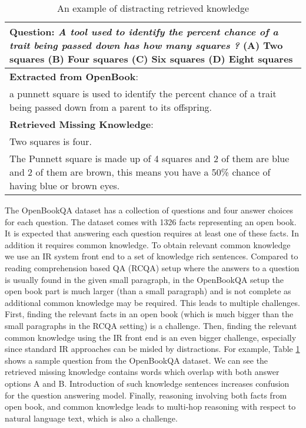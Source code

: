 \documentclass[11pt,a4paper]{article}
\begin{document}
\begin{table}[H]
\begin{center}
\begin{tabular}{|p{7cm}|}
\hline \textbf{Question:} \textit{A tool used to identify the percent chance of a trait being passed down has how many squares ? } (A) Two squares (B) \textbf{Four squares} (C) Six squares (D) Eight squares \\  
\hline
\textbf{Extracted from OpenBook}:\\
a punnett square is used to identify the percent 
chance of a trait being passed down from a parent 
to its offspring.\\
\hline
\textbf{Retrieved Missing Knowledge}: \\
Two squares is four. \\
The Punnett square is made up of 4 squares and 2 of them are blue and 2 of them are brown, this means you have a 50\% chance of having blue or brown eyes. \\
\hline
\end{tabular}
\end{center}
\caption{\label{tab1} An example of distracting retrieved knowledge }
\end{table}

The OpenBookQA dataset has a collection of questions and four answer choices for each question. The dataset comes with 1326 facts representing an open book. It is expected that answering each question requires at least one of these facts. In addition it requires common knowledge. To obtain relevant common knowledge we use an IR system \cite{clark2016combining} front end to a set of knowledge rich sentences.  Compared to reading comprehension based QA (RCQA) setup where the answers to a question is usually found in the given small paragraph, in the OpenBookQA  setup the open book part is much larger (than a small paragraph) and is not complete as additional common knowledge may be required. This leads to multiple challenges. First, finding the relevant facts in an open book (which is much bigger than the small paragraphs in the RCQA setting) is a challenge. Then, finding the relevant common knowledge using the IR front end is an even bigger challenge, especially since standard IR approaches can be misled by distractions. For example, Table \ref{tab1} shows a sample question from the OpenBookQA dataset. We can see the retrieved missing knowledge contains words which overlap with both answer options A and B. Introduction of such knowledge sentences increases confusion for the question answering model. Finally, reasoning involving both facts from open book, and common knowledge leads to multi-hop reasoning with respect to natural language text, which is also a challenge.  
\end{document}
